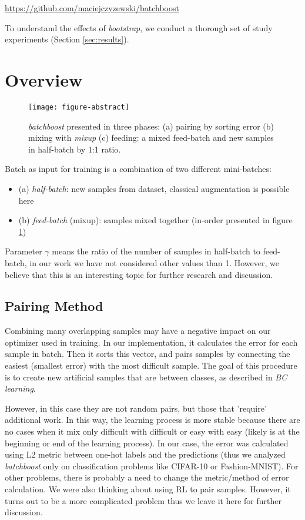 \documentclass{article}
\begin{document}
\begin{center}
\url{https://github.com/maciejczyzewski/batchboost}
\end{center}

To understand the effects of \emph{bootstrap}, we conduct a
thorough set of study experiments (Section \ref{sec:results}).

\section{Overview}
\label{sec:overview}

\begin{figure}[H]
  \centering
  \texttt{[image: figure-abstract]}
  \caption{\emph{batchboost} presented in three phases: (a) pairing by sorting
	  error (b) mixing with \emph{mixup} (c) feeding: a mixed feed-batch and new
	  samples in half-batch by 1:1 ratio.}
  \label{fig:abstract}
\end{figure}

Batch as input for training is a combination of two different mini-batches:
\begin{itemize}
\item (a) \emph{half-batch}: new samples from dataset, classical augmentation is possible here
\item (b) \emph{feed-batch} (mixup): samples mixed together (in-order presented in
figure \ref{fig:abstract})
\end{itemize}

Parameter $\gamma$ means the ratio of the number of samples in half-batch to
feed-batch, in our work we have not considered other values than 1. However, we believe that this is an interesting topic for further research and discussion.

\subsection{Pairing Method}
\label{sec:pairing}

Combining many overlapping samples may have a negative impact on our optimizer
used in training.  In our implementation, it calculates the error for each
sample in batch.  Then it sorts this vector, and pairs samples by connecting the
easiest (smallest error) with the most difficult sample.  The goal of this
procedure is to create new artificial samples that are between classes, as
described in \emph{BC learning}.

However, in this case they are not random pairs, but those that 'require'
additional work. In this way, the learning process is more stable because there
are no cases when it mix only difficult with difficult or easy with easy (likely
is at the beginning or end of the learning process).
In our case, the error was calculated using L2 metric between one-hot labels and
the predictions (thus we analyzed \emph{batchboost} only on classification
problems like CIFAR-10\cite{krizhevsky2009learning} or
Fashion-MNIST\cite{xiao2017}). For other problems, there is probably
a need to change the metric/method of error calculation.
We were also thinking about using RL to pair samples. However, it turns out to
be a more complicated problem thus we leave it here for further discussion.
\end{document}
